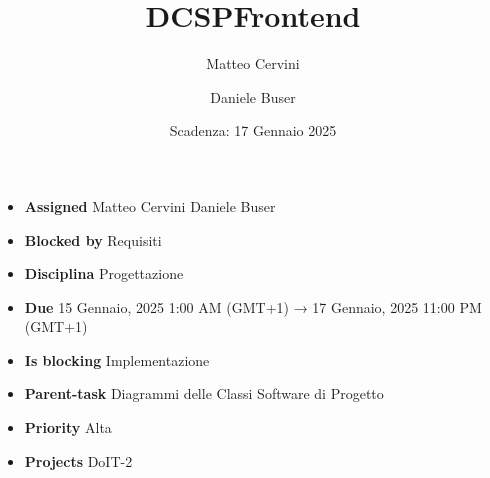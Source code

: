 \title{DCSPFrontend}
\author{Matteo Cervini \and Daniele Buser}
\date{Scadenza: 17 Gennaio 2025}

\maketitle

\begin{itemize}
    \item \textbf{Assigned} Matteo Cervini Daniele Buser
    \item \textbf{Blocked by} Requisiti
    \item \textbf{Disciplina} Progettazione
    \item \textbf{Due} 15 Gennaio, 2025 1:00 AM (GMT+1) → 17 Gennaio, 2025 11:00 PM (GMT+1)
    \item \textbf{Is blocking} Implementazione
    \item \textbf{Parent-task} Diagrammi delle Classi Software di Progetto
    \item \textbf{Priority} Alta
    \item \textbf{Projects} DoIT-2
\end{itemize}